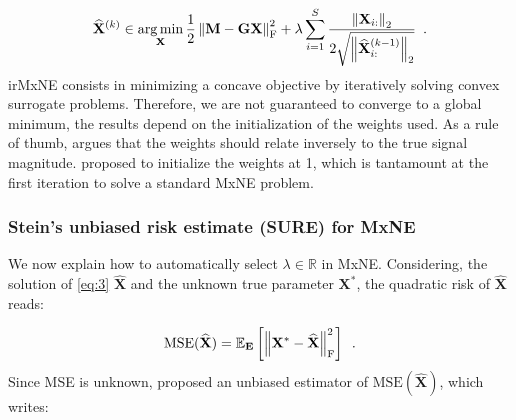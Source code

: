 \begin{equation} \label{eq:5}
    \widehat{\mathbf{X}}^{(k)}
    \in
    \operatorname*{arg\,min}_{\mathbf{X}}
    \frac{1}{2}\left \lVert \mathbf{M - GX} \right \rVert^2_{\text{F}}
    + \lambda \sum_{i=1}^{S} 
    \frac{\left \lVert \mathbf{X}_{i:} \right \rVert_2}
    {2 \sqrt{\left \lVert \widehat{\mathbf{X}}^{(k-1)}_{i:} \right \rVert_2}}
    \enspace .
\end{equation}
%
irMxNE consists in minimizing a concave objective by iteratively solving convex surrogate problems. Therefore, we are not guaranteed to
converge to a global minimum, the results depend on the initialization of the weights used. As a rule of thumb, \cite{Candes_Wakin_Boyd08} argues
that the weights should relate inversely to the true signal magnitude. \cite{Strohmeier_Bekhti_Haueisen_Gramfort_2016} proposed to initialize
the weights at 1, which is tantamount at the first iteration to solve a standard MxNE problem.

\subsubsection{Stein's unbiased risk estimate (SURE) for MxNE}

We now explain how to automatically select $\lambda \in \mathbb{R}$ in MxNE. Considering, the solution of 
\eqref{eq:3} $\widehat{\mathbf{X}}$ and the unknown true parameter $\mathbf{X}^*$, the quadratic risk of $\widehat{\mathbf{X}}$
reads:

\begin{equation} \label{eq:6}
    \text{MSE}(\widehat{\mathbf{X}})
    = \mathbb{E}_{\mathbf{E}}
    \left[
        \left \lVert 
            \mathbf{X}^* - \widehat{\mathbf{X}}
         \right \rVert_{\text{F}}^2
    \right]
    \enspace .
\end{equation}
%
Since MSE is unknown, \cite{Stein81} proposed an unbiased estimator of $\text{MSE}(\widehat{\mathbf{X}})$,
which writes:

